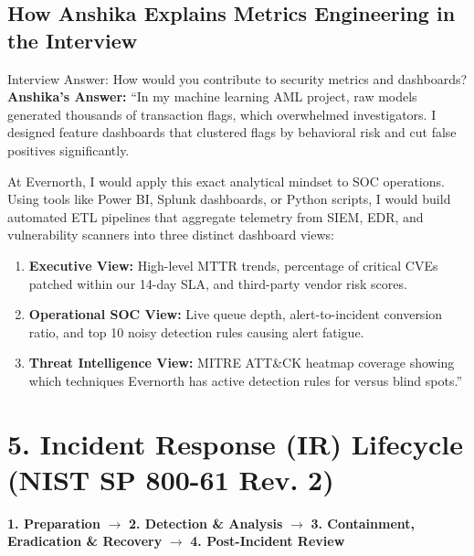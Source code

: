 \documentclass[10pt,a4paper]{article}
\begin{document}
\subsection{How Anshika Explains Metrics Engineering in the Interview}
\begin{qa}{Interview Answer: How would you contribute to security metrics and dashboards?}
\textbf{Anshika's Answer:}
``In my machine learning AML project, raw models generated thousands of transaction flags, which overwhelmed investigators. I designed feature dashboards that clustered flags by behavioral risk and cut false positives significantly. 

At Evernorth, I would apply this exact analytical mindset to SOC operations. Using tools like Power BI, Splunk dashboards, or Python scripts, I would build automated ETL pipelines that aggregate telemetry from SIEM, EDR, and vulnerability scanners into three distinct dashboard views:
\begin{enumerate}[noitemsep]
    \item \textbf{Executive View:} High-level MTTR trends, percentage of critical CVEs patched within our 14-day SLA, and third-party vendor risk scores.
    \item \textbf{Operational SOC View:} Live queue depth, alert-to-incident conversion ratio, and top 10 noisy detection rules causing alert fatigue.
    \item \textbf{Threat Intelligence View:} MITRE ATT\&CK heatmap coverage showing which techniques Evernorth has active detection rules for versus blind spots.''
\end{enumerate}
\end{qa}

\section{5. Incident Response (IR) Lifecycle (NIST SP 800-61 Rev. 2)}

\begin{center}
\textbf{1. Preparation} $\longrightarrow$ \textbf{2. Detection \& Analysis} $\longrightarrow$ \textbf{3. Containment, Eradication \& Recovery} $\longrightarrow$ \textbf{4. Post-Incident Review}
\end{center}
\end{document}
